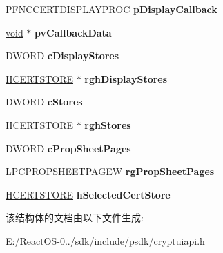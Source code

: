 \begin{DoxyCompactItemize}
P\+F\+N\+C\+C\+E\+R\+T\+D\+I\+S\+P\+L\+A\+Y\+P\+R\+OC {\bfseries p\+Display\+Callback}
\item 
\mbox{\label{struct___c_r_y_p_t_u_i___s_e_l_e_c_t_c_e_r_t_i_f_i_c_a_t_e___s_t_r_u_c_t_w_a51016253cb81b37c7d279fe26e03797e}} 
\hyperlink{interfacevoid}{void} $\ast$ {\bfseries pv\+Callback\+Data}
\item 
\mbox{\label{struct___c_r_y_p_t_u_i___s_e_l_e_c_t_c_e_r_t_i_f_i_c_a_t_e___s_t_r_u_c_t_w_a9907f249f743fc86fbaa2a630d7ec689}} 
D\+W\+O\+RD {\bfseries c\+Display\+Stores}
\item 
\mbox{\label{struct___c_r_y_p_t_u_i___s_e_l_e_c_t_c_e_r_t_i_f_i_c_a_t_e___s_t_r_u_c_t_w_a69694ed58c4bfec2a8ee2e083b63ba42}} 
\hyperlink{interfacevoid}{H\+C\+E\+R\+T\+S\+T\+O\+RE} $\ast$ {\bfseries rgh\+Display\+Stores}
\item 
\mbox{\label{struct___c_r_y_p_t_u_i___s_e_l_e_c_t_c_e_r_t_i_f_i_c_a_t_e___s_t_r_u_c_t_w_a4bc069b0ac94f21d6414ad418b963f0a}} 
D\+W\+O\+RD {\bfseries c\+Stores}
\item 
\mbox{\label{struct___c_r_y_p_t_u_i___s_e_l_e_c_t_c_e_r_t_i_f_i_c_a_t_e___s_t_r_u_c_t_w_af7db42856c44c6349a2615e157950b6f}} 
\hyperlink{interfacevoid}{H\+C\+E\+R\+T\+S\+T\+O\+RE} $\ast$ {\bfseries rgh\+Stores}
\item 
\mbox{\label{struct___c_r_y_p_t_u_i___s_e_l_e_c_t_c_e_r_t_i_f_i_c_a_t_e___s_t_r_u_c_t_w_a01fd3563dea0ba2d8d4917ff0d338b79}} 
D\+W\+O\+RD {\bfseries c\+Prop\+Sheet\+Pages}
\item 
\mbox{\label{struct___c_r_y_p_t_u_i___s_e_l_e_c_t_c_e_r_t_i_f_i_c_a_t_e___s_t_r_u_c_t_w_a744c3ac4fbedecbaaaa2197ac7876161}} 
\hyperlink{struct___p_r_o_p_s_h_e_e_t_p_a_g_e_w}{L\+P\+C\+P\+R\+O\+P\+S\+H\+E\+E\+T\+P\+A\+G\+EW} {\bfseries rg\+Prop\+Sheet\+Pages}
\item 
\mbox{\label{struct___c_r_y_p_t_u_i___s_e_l_e_c_t_c_e_r_t_i_f_i_c_a_t_e___s_t_r_u_c_t_w_aadb9210cf037f86b5fa142e0f745c785}} 
\hyperlink{interfacevoid}{H\+C\+E\+R\+T\+S\+T\+O\+RE} {\bfseries h\+Selected\+Cert\+Store}
\end{DoxyCompactItemize}


该结构体的文档由以下文件生成\+:\begin{DoxyCompactItemize}
\item 
E\+:/\+React\+O\+S-\/0../sdk/include/psdk/cryptuiapi.\+h\end{DoxyCompactItemize}

